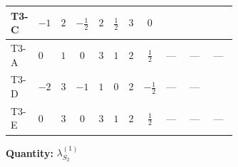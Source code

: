 \documentclass[8pt]{article}
\begin{document}
\begin{landscape}
\begin{longtable}{@{}llcccccc >{\raggedright\arraybackslash}p{0.21\linewidth} >{\raggedright\arraybackslash}p{0.21\linewidth} >{\raggedright\arraybackslash}p{0.21\linewidth}@{}}
T3-C & $-1$ & $2$ & $-\frac{1}{2}$ & $2$ & $\frac{1}{2}$ & $3$ & $0$ & \scriptsize\adjustbox{max width=\linewidth}{$\begin{gathered} {\lambda_{10}} (3 \operatorname{Tr}\!\left({y_1}\,\left({y_2}\right)^{\dagger}\right)+24 \left({\lambda_{10}}\right)^{*})\end{gathered}$} & \scriptsize\adjustbox{max width=\linewidth}{$\begin{gathered} +3 \left({\lambda_{10}}\right)^{*} \operatorname{Tr}\!\left({y_2}\,\left({y_1}\right)^{\dagger}\right)\end{gathered}$} & \scriptsize\adjustbox{max width=\linewidth}{$\begin{gathered} +6 {\lambda_{S_2}^{(1)}} T_{\nu}^{(2)}\end{gathered}$} \\
\midrule
T3-A & $0$ & $1$ & $0$ & $3$ & $1$ & $2$ & $\frac{1}{2}$ & --- & --- & --- \\
\midrule
T3-D & $-2$ & $3$ & $-1$ & $1$ & $0$ & $2$ & $-\frac{1}{2}$ & --- & --- & \scriptsize\adjustbox{max width=\linewidth}{$\begin{gathered} 8 {\lambda_{S_2}^{(1)}} T_{\nu}^{(2)}\end{gathered}$} \\
\midrule
T3-E & $0$ & $3$ & $0$ & $3$ & $1$ & $2$ & $\frac{1}{2}$ & --- & --- & --- \\
\midrule
\bottomrule
\end{longtable}
\clearpage
\noindent\textbf{Quantity: }$\lambda_{S_2}^{(1)}$\par\smallskip

\end{landscape}
\end{document}
